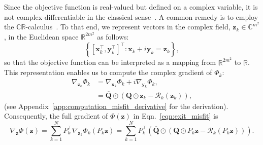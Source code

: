 \documentclass{article}
\numberwithin{equation}{section}
\begin{document}
Since the objective function is real-valued but defined on a complex variable, it is not complex-differentiable in the classical sense~\cite{lang1985complex}. A common remedy is to employ the $\mathbb{C}\mathbb{R}$-calculus~\cite{CRcalculus}. To that end, we represent vectors in the complex field, $\bm{z}_k\in \mathbb{C}^{m^2}$, in the Euclidean space $\mathbb{R}^{2m^2}$ as follows:
\begin{equation*}
\left\{ [\bm{x}_k^\top, \bm{y}_k^\top]^\top : \bm{x}_k + i\bm{y}_k = \bm{z}_k \right\},
\end{equation*}
so that the objective function can be interpreted as a mapping from $\mathbb{R}^{2m^2}$ to $\mathbb{R}$. This representation enables us to compute the complex gradient of $\Phi_k$:
\begin{equation}\label{eqn:misfit_derivative}
\begin{aligned}
    \nabla_{\bm{z}_k} \Phi_k  &= \nabla_{\bm{x}_k}\Phi_k + i\nabla_{\bm{y}_k}\Phi_k,\\
    &= \overline{\bm{Q}}\odot\left(\bm{Q}\odot\bm{z}_k - \mathcal{R}_k(\bm{z}_k)\right),
\end{aligned}
\end{equation}
(see Appendix~\ref{app:computation_misfit_derivative} for the derivation). Consequently, the full gradient of $\Phi(\bm{z})$ in Eqn.~\eqref{eqn:exit_misfit} is
\begin{equation*} 
     \nabla_{\bm{z}}\Phi(\bm{z}) = \sum_{k=1}^N P_k^\top \nabla_{\bm{z}_k}\Phi_k(P_k\bm{z}) = \sum_{k=1}^N P_k^\top \left(\overline{\bm{Q}}\odot\left(\bm{Q}\odot P_k\bm{z} - \mathcal{R}_k\left(P_k\bm{z}\right)\right)\right).
\end{equation*}
\end{document}
